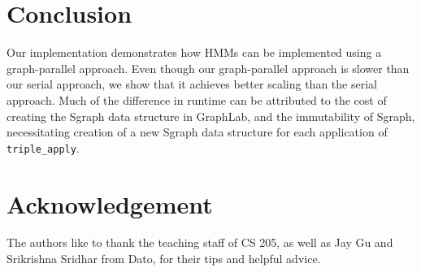 \section{Conclusion}

Our implementation demonstrates how HMMs can be implemented using a
graph-parallel approach. Even though our graph-parallel approach is slower than
our serial approach, we show that it achieves better scaling than the serial
approach. Much of the difference in runtime can be attributed to the cost of
creating the Sgraph data structure in GraphLab, and the immutability of Sgraph,
necessitating creation of a new Sgraph data structure for each application of
\texttt{triple\_apply}. 

\section*{Acknowledgement}

The authors like to thank the teaching staff of CS 205, as well as Jay Gu and
Srikrishna Sridhar from Dato, for their tips and helpful advice.

